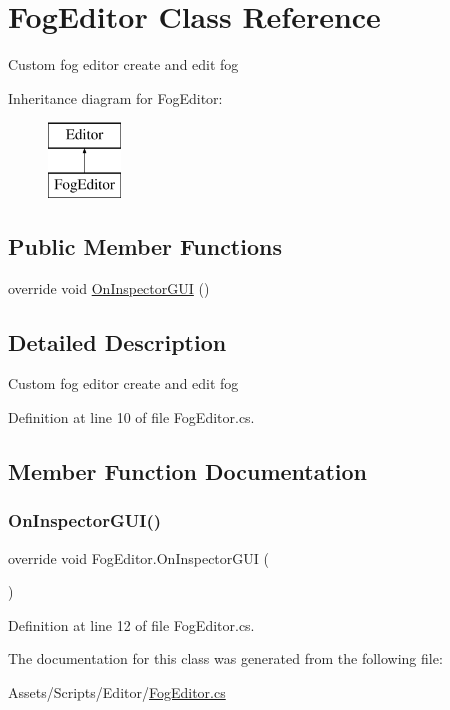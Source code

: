 \hypertarget{class_fog_editor}{}\section{Fog\+Editor Class Reference}
\label{class_fog_editor}


Custom fog editor create and edit fog  


Inheritance diagram for Fog\+Editor\+:\begin{figure}[H]
\begin{center}
\leavevmode
\includegraphics[height=2.000000cm]{class_fog_editor}
\end{center}
\end{figure}
\subsection*{Public Member Functions}
\begin{DoxyCompactItemize}
\item 
override void \mbox{\hyperlink{class_fog_editor_a4015903e78f5471fb0f4963677c97276}{On\+Inspector\+G\+UI}} ()
\end{DoxyCompactItemize}


\subsection{Detailed Description}
Custom fog editor create and edit fog 



Definition at line 10 of file Fog\+Editor.\+cs.



\subsection{Member Function Documentation}
\mbox{\label{class_fog_editor_a4015903e78f5471fb0f4963677c97276}} 
\subsubsection{\texorpdfstring{On\+Inspector\+G\+U\+I()}{OnInspectorGUI()}}
{\footnotesize\ttfamily override void Fog\+Editor.\+On\+Inspector\+G\+UI (\begin{DoxyParamCaption}{ }\end{DoxyParamCaption})}



Definition at line 12 of file Fog\+Editor.\+cs.



The documentation for this class was generated from the following file\+:\begin{DoxyCompactItemize}
\item 
Assets/\+Scripts/\+Editor/\mbox{\hyperlink{_fog_editor_8cs}{Fog\+Editor.\+cs}}\end{DoxyCompactItemize}

